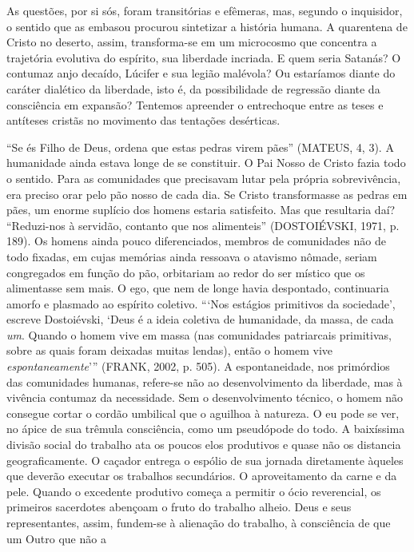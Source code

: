 As questões, por si sós, foram transitórias e efêmeras, mas, segundo o
inquisidor, o sentido que as embasou procurou sintetizar a história
humana. A quarentena de Cristo no deserto, assim, transforma-se em um
microcosmo que concentra a trajetória evolutiva do espírito, sua
liberdade incriada. E quem seria Satanás? O contumaz anjo decaído,
Lúcifer e sua legião malévola? Ou estaríamos diante do caráter dialético
da liberdade, isto é, da possibilidade de regressão diante da
consciência em expansão? Tentemos apreender o entrechoque entre as teses
e antíteses cristãs no movimento das tentações desérticas.

``Se és Filho de Deus, ordena que estas pedras virem pães'' (MATEUS, 4,
3). A humanidade ainda estava longe de se constituir. O Pai Nosso de
Cristo fazia todo o sentido. Para as comunidades que precisavam lutar
pela própria sobrevivência, era preciso orar pelo pão nosso de cada dia.
Se Cristo transformasse as pedras em pães, um enorme suplício dos homens
estaria satisfeito. Mas que resultaria daí? ``Reduzi-nos à servidão,
contanto que nos alimenteis'' (DOSTOIÉVSKI, 1971, p. 189). Os homens
ainda pouco diferenciados, membros de comunidades não de todo fixadas,
em cujas memórias ainda ressoava o atavismo nômade, seriam congregados
em função do pão, orbitariam ao redor do ser místico que os alimentasse
sem mais. O ego, que nem de longe havia despontado, continuaria amorfo e
plasmado ao espírito coletivo. ```Nos estágios primitivos da sociedade',
escreve Dostoiévski, `Deus é a ideia coletiva de humanidade, da massa,
de cada \emph{um}. Quando o homem vive em massa (nas comunidades
patriarcais primitivas, sobre as quais foram deixadas muitas lendas),
então o homem vive \emph{espontaneamente}''' (FRANK, 2002, p. 505). A
espontaneidade, nos primórdios das comunidades humanas, refere-se não ao
desenvolvimento da liberdade, mas à vivência contumaz da necessidade.
Sem o desenvolvimento técnico, o homem não consegue cortar o cordão
umbilical que o aguilhoa à natureza. O eu pode se ver, no ápice de sua
trêmula consciência, como um pseudópode do todo. A baixíssima divisão
social do trabalho ata os poucos elos produtivos e quase não os
distancia geograficamente. O caçador entrega o espólio de sua jornada
diretamente àqueles que deverão executar os trabalhos secundários. O
aproveitamento da carne e da pele. Quando o excedente produtivo começa a
permitir o ócio reverencial, os primeiros sacerdotes abençoam o fruto do
trabalho alheio. Deus e seus representantes, assim, fundem-se à
alienação do trabalho, à consciência de que um Outro que não a
